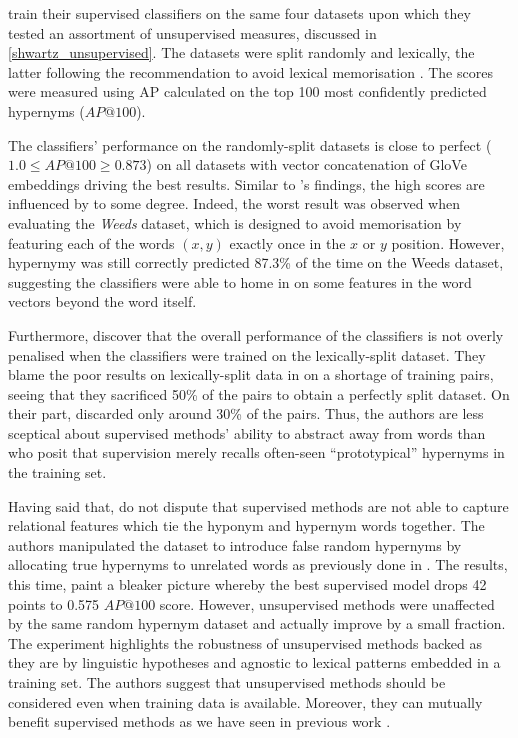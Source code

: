 \citeauthor{shwartz2017siege} train their supervised classifiers on the same four datasets upon which they tested an assortment of unsupervised measures, discussed in \cref{shwartz_unsupervised}.  The datasets were split randomly and lexically, the latter following the \citeauthor{levy2015supervised} recommendation to avoid lexical memorisation \citep{levy2015supervised}.  The scores were measured using \ac{AP} calculated on the top 100 most confidently predicted hypernyms ($AP@100$).

The classifiers’ performance on the randomly-split datasets is close to perfect ($1.0 \leq AP@100 \geq 0.873$) on all datasets with vector concatenation of GloVe embeddings driving the best results.  Similar to \citet{levy2015supervised}'s findings, the high scores are influenced by  to some degree.  Indeed, the worst result was observed when evaluating the \textit{Weeds} \citep{weeds2014learning} dataset, which is designed to avoid memorisation by featuring each of the words $(x, y)$ exactly once in the $x$ or $y$ position.  However, hypernymy was still correctly predicted 87.3\% of the time on the Weeds dataset, suggesting the classifiers were able to home in on some features in the word vectors beyond the word itself.

Furthermore, \citeauthor{shwartz2017siege} discover that the overall performance of the classifiers is not overly penalised when the classifiers were trained on the lexically-split dataset.  They blame the poor results on lexically-split data in \citep{levy2015supervised} on a shortage of training pairs, seeing that they sacrificed 50\% of the pairs to obtain a perfectly split dataset.  On their part, \citeauthor{shwartz2017siege} discarded only around 30\% of the pairs.  Thus, the authors are less sceptical about supervised methods’ ability to abstract away from words than \citeauthor{levy2015supervised} who posit that supervision merely recalls often-seen ``prototypical'' hypernyms in the training set.

Having said that, \citeauthor{shwartz2017siege} do not dispute that supervised methods are not able to capture relational features which tie the hyponym and hypernym words together.  The authors manipulated the dataset to introduce false random hypernyms by allocating true hypernyms to unrelated words as previously done in \citep{santus2016nine, levy2015supervised}.  The results, this time, paint a bleaker picture whereby the best supervised model drops 42 points to 0.575 $AP@100$ score.  However, unsupervised methods were unaffected by the same random hypernym dataset and actually improve by a small fraction.  The experiment highlights the robustness of unsupervised methods backed as they are by linguistic hypotheses and agnostic to lexical patterns embedded in a training set.  The authors suggest that unsupervised methods should be considered even when training data is available. Moreover, they can mutually benefit supervised methods as we have seen in previous work \citep{roller2014inclusive, santus2016nine}.

